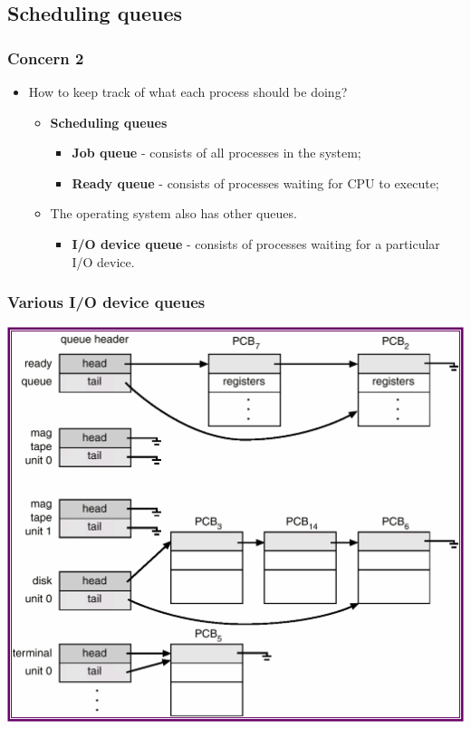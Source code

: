 \documentclass[CJKutf8,xcolor=pdftex,dvipsnames,table]{beamer}
\begin{document}
\begin{CJK*}{UTF8}{song}
  \subsection{Scheduling queues}

  \begin{frame}
  \frametitle{Concern 2} \pause
  \begin{itemize}
  \item{How to keep track of what each process should be doing?} \pause
    \begin{itemize}
    \item{\textbf{Scheduling queues}} \pause
      \begin{itemize}
      \item{\textbf{Job queue} \pause - consists of all processes in the system;} \pause
      \item{\textbf{Ready queue} \pause - consists of processes waiting for CPU to execute;} \pause
      \end{itemize}
    \item{The operating system also has other queues.} \pause
      \begin{itemize}
      \item{\textbf{I/O device queue} \pause - consists of processes waiting for a particular I/O device.}
      \end{itemize}
    \end{itemize}
  \end{itemize}
  \end{frame}

  \begin{frame}
  \frametitle{Various I/O device queues} \pause
  \begin{center}
  \includegraphics[scale=0.5]{v6f4-4}
  \end{center}
  \end{frame}


\end{CJK*}
\end{document}
